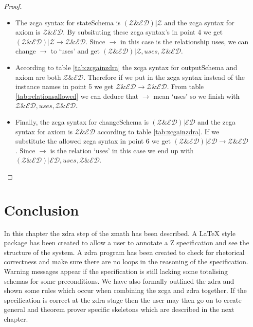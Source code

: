\begin{proof}
\begin{itemize}
\item The \gls{zcga} syntax for stateSchema is $(\mathcal{Z} \& \mathcal{ED}) |
\mathcal{Z}$ and the \gls{zcga} syntax for axiom is  $\mathcal{Z} \&
\mathcal{ED}$. By subsituting these \gls{zcga} syntax's in point 4 we get
$(\mathcal{Z} \& \mathcal{ED}) | \mathcal{Z} \longrightarrow \mathcal{Z} \&
\mathcal{ED}$. Since $\longrightarrow$ in this case is the relationship uses, we
can change $\longrightarrow$ to `uses' and get $(\mathcal{Z} \& \mathcal{ED}) |
\mathcal{Z}, uses, \mathcal{Z} \& \mathcal{ED}$.

\item According to table \ref{tab:zcgainzdra} the \gls{zcga} syntax for
outputSchema and axiom are both $\mathcal{Z} \& \mathcal{ED}$. Therefore if we
put in the \gls{zcga} syntax instead of the instance names in point 5 we get
$\mathcal{Z} \& \mathcal{ED} \longrightarrow \mathcal{Z} \& \mathcal{ED}$. From
table \ref{tab:relationsallowed} we can deduce that $\longrightarrow$ mean
`uses' so we finish with $\mathcal{Z} \& \mathcal{ED}, uses, \mathcal{Z} \&
\mathcal{ED}$.

\item Finally, the \gls{zcga} syntax for changeSchema is $(\mathcal{Z} \&
\mathcal{ED}) | \mathcal{ED}$ and the \gls{zcga} syntax for axiom is
$\mathcal{Z} \& \mathcal{ED}$ according to table \ref{tab:zcgainzdra}. If we
substitute the allowed \gls{zcga} syntax in point 6 we get $(\mathcal{Z} \&
\mathcal{ED}) | \mathcal{ED} \longrightarrow \mathcal{Z} \& \mathcal{ED}$. Since
$\longrightarrow$ is the relation `uses' in this case we end up with
$(\mathcal{Z} \& \mathcal{ED}) | \mathcal{ED}, uses, \mathcal{Z} \&
\mathcal{ED}$.
\end{itemize}
\end{proof}

\section{Conclusion}
In this chapter the \gls{zdra} step of the \gls{zmath} has been described. A
\LaTeX{} style package has been created to allow a user to annotate a Z
specification and see the structure of the system. A \gls{zdra} program has been
created to check for rhetorical correctness and make sure there are no loops in
the reasoning of the specification. Warning messages appear if the specification
is still lacking some totalising schemas for some preconditions. We have also
formally outlined the \gls{zdra} and shown some rules which occur when combining
the \gls{zcga} and \gls{zdra} together. If the specification is correct at the
\gls{zdra} stage then the user may then go on to create general and theorem
prover specific skeletons which are described in the next chapter.
